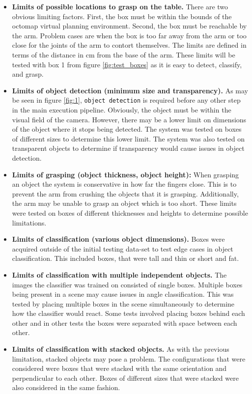\documentclass[letterpaper, 10 pt, conference]{conf/ieeeconf}  %
\begin{document}
\begin{itemize}
\item \textbf{Limits of possible locations to grasp on the table.}
  There are two obvious limiting factors. First, the box must be within the
  bounds of the octomap virtual planning environment. Second, the box must be
  reachable by the arm. Problem cases are when the box is too far away from the
  arm or too close for the joints of the arm to contort themselves. The limits are
  defined in terms of the distance in \si{\centi\meter} from the base of the arm.
  These limits will be tested with box 1 from figure \ref{fig:test_boxes} as it
  is easy to detect, classify, and grasp.
\item \textbf{Limits of object detection (minimum size and transparency).}
  As may be seen in figure \ref{fig:1}, \texttt{object detection} is required
  before any other step in the main execution pipeline. Obviously, the object must
  be within the visual field of the camera. However, there may be a lower limit on
  dimensions of the object where it stops being detected. The system was tested on
  boxes of different sizes to determine this lower limit. The system was also
  tested on transparent objects to determine if transparency would cause issues in
  object detection.
\item \textbf{Limits of grasping (object thickness, object height):}
  When grasping an object the system is conservative in how far the fingers
  close. This is to prevent the arm from crushing the objects that it is grasping.
  Additionally, the arm may be unable to grasp an object which is too short. These
  limits were tested on boxes of different thicknesses and heights to determine
  possible limitations.
\item \textbf{Limits of classification (various object dimensions).}
  Boxes were acquired outside of the initial testing data-set to test edge cases
  in object classification. This included boxes, that were tall and
  thin or short and fat.
\item \textbf{Limits of classification with multiple independent objects.}
  The images the classifier was trained on consisted of single boxes. Multiple
  boxes being present in a scene may cause issues in angle classification. This
  was tested by placing multiple boxes in the scene simultaneously to determine
  how the classifier would react. Some tests involved placing boxes behind each
  other and in other tests the boxes were separated with space between each other.
\item \textbf{Limits of classification with stacked objects.}
  As with the previous limitation, stacked objects may pose a problem. The
  configurations that were considered were boxes that were stacked with the same
  orientation and perpendicular to each other. Boxes of different sizes that were
  stacked were also considered in the same fashion.
\end{itemize}
\end{document}
